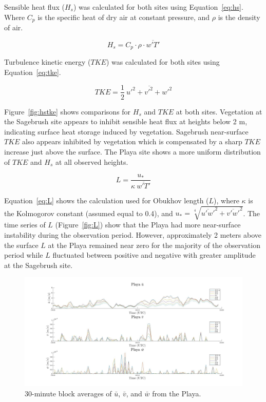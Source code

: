 \documentclass[]{article}
\begin{document}
Sensible heat flux ($H_s$) was calculated for both sites using Equation~\ref{eq:hs}. Where $C_p$ is the specific heat of dry air at constant pressure, and $\rho$ is the density of air.

\begin{equation}
H_s = C_p \cdot \rho \cdot \overline{w'T'}
\label{eq:hs}
\end{equation}

Turbulence kinetic energy ($TKE$) was calculated for both sites using Equation~\ref{eq:tke}. 

\begin{equation}
TKE = \frac{1}{2}~ \overline{u'^2 + v'^2 + w'^2}
\label{eq:tke}
\end{equation}

Figure~\ref{fig:hstke} shows comparisons for $H_s$ and $TKE$ at both sites. Vegetation at the Sagebrush site appears to inhibit sensible heat flux at heights below 2 m, indicating surface heat storage induced by vegetation. Sagebrush near-surface $TKE$ also appears inhibited by vegetation which is compensated by a sharp $TKE$ increase just above the surface. The Playa site shows a more uniform distribution of $TKE$ and $H_s$ at all observed heights.

\begin{equation}
L = \frac{u_*}{\kappa~ \overline{w'T'}}
\label{eq:L}
\end{equation}

Equation~\ref{eq:L} shows the calculation used for Obukhov length ($L$), where $\kappa$ is the Kolmogorov constant (assumed equal to 0.4), and $u_* = \sqrt[4]{\overline{u'w'}^2 + \overline{v'w'}^2}$. The time series of $L$ (Figure~\ref{fig:L}) show that the Playa had more near-surface instability during the observation period. However, approximately 2 meters above the surface $L$ at the Playa remained near zero for the majority of the observation period while $L$ fluctuated between positive and negative with greater amplitude at the Sagebrush site. 

\begin{figure}
	\centering
	\includegraphics[width=\textwidth]{playarotate}
	\caption{30-minute block averages of $\bar{u}$, $\bar{v}$, and $\bar{w}$ from the Playa.}
	\label{fig:playarotate}
\end{figure}
\end{document}
